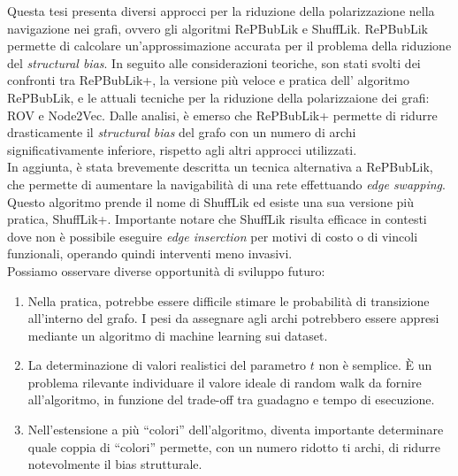 Questa tesi presenta diversi approcci per la riduzione della polarizzazione nella navigazione nei grafi, ovvero gli algoritmi RePBubLik e ShuffLik.
RePBubLik permette di calcolare un'approssimazione accurata per il problema della riduzione del \emph{structural bias}.
In seguito alle considerazioni teoriche, son stati svolti dei confronti tra RePBubLik+, la versione più veloce e pratica dell'
algoritmo RePBubLik, e le attuali tecniche per la riduzione della polarizzaione dei grafi: ROV e 
Node2Vec. Dalle analisi, è emerso che RePBubLik+ permette di ridurre drasticamente il \emph{structural bias} 
del grafo con un numero di archi significativamente inferiore, rispetto agli altri approcci utilizzati. 
\\
In aggiunta, è stata brevemente descritta un tecnica alternativa a RePBubLik, che permette di aumentare
la navigabilità di una rete effettuando \emph{edge swapping}. 
Questo algoritmo prende il nome di ShuffLik ed esiste una sua versione più pratica, ShuffLik+.
Importante notare che ShuffLik risulta efficace in contesti dove non è possibile eseguire \emph{edge inserction} per motivi di costo o di vincoli funzionali, 
operando quindi interventi meno invasivi.
\\
Possiamo osservare diverse opportunità di sviluppo futuro:
\begin{enumerate}
    \item Nella pratica, potrebbe essere difficile stimare le probabilità di transizione all'interno del grafo. I pesi da assegnare agli archi potrebbero 
    essere appresi mediante un algoritmo di machine learning sui dataset.
    \item La determinazione di valori realistici del parametro $t$ non è semplice. È un problema rilevante individuare il valore ideale di random walk da fornire all'algoritmo, in funzione del trade-off tra guadagno e tempo di esecuzione.
    \item Nell'estensione a più ``colori'' dell'algoritmo, diventa importante determinare quale coppia di ``colori'' permette, con un numero ridotto ti archi, di ridurre notevolmente il bias strutturale.
\end{enumerate} 